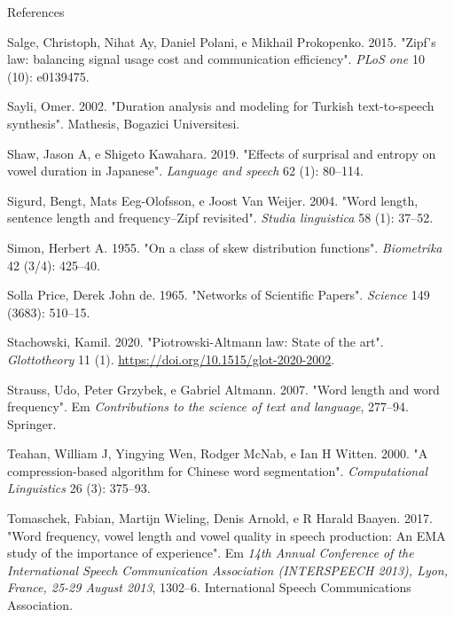 \documentclass[
  ignorenonframetext,
  aspectratio=169]{beamer}
\newlength{\cslhangindent}
\newlength{\cslentryspacingunit} %
\newenvironment{CSLReferences}[2] %
 {%
  \setlength{\parindent}{0pt}
  \ifodd #1
  \let\oldpar\par
  \def\par{\hangindent=\cslhangindent\oldpar}
  \fi
  \setlength{\parskip}{#2\cslentryspacingunit}
 }%
 {}
\begin{document}
\begin{frame}[allowframebreaks]{References}
\begin{CSLReferences}{1}{0}
\leavevmode{}%
Salge, Christoph, Nihat Ay, Daniel Polani, e Mikhail Prokopenko. 2015.
{"Zipf's law: balancing signal usage cost and communication
efficiency"}. \emph{PLoS one} 10 (10): e0139475.

\leavevmode{}%
Sayli, Omer. 2002. {"Duration analysis and modeling for Turkish
text-to-speech synthesis"}. Mathesis, Bogazici Universitesi.

\leavevmode{}%
Shaw, Jason A, e Shigeto Kawahara. 2019. {"Effects of surprisal and
entropy on vowel duration in Japanese"}. \emph{Language and speech} 62
(1): 80--114.

\leavevmode{}%
Sigurd, Bengt, Mats Eeg-Olofsson, e Joost Van Weijer. 2004. {"Word
length, sentence length and frequency--Zipf revisited"}. \emph{Studia
linguistica} 58 (1): 37--52.

\leavevmode{}%
Simon, Herbert A. 1955. {"On a class of skew distribution functions"}.
\emph{Biometrika} 42 (3/4): 425--40.

\leavevmode{}%
Solla Price, Derek John de. 1965. {"Networks of Scientific Papers"}.
\emph{Science} 149 (3683): 510--15.

\leavevmode{}%
Stachowski, Kamil. 2020. {"Piotrowski-Altmann law: State of the art"}.
\emph{Glottotheory} 11 (1).
\url{https://doi.org/10.1515/glot-2020-2002}.

\leavevmode{}%
Strauss, Udo, Peter Grzybek, e Gabriel Altmann. 2007. {"Word length and
word frequency"}. Em \emph{Contributions to the science of text and
language}, 277--94. Springer.

\leavevmode{}%
Teahan, William J, Yingying Wen, Rodger McNab, e Ian H Witten. 2000. {"A
compression-based algorithm for Chinese word segmentation"}.
\emph{Computational Linguistics} 26 (3): 375--93.

\leavevmode{}%
Tomaschek, Fabian, Martijn Wieling, Denis Arnold, e R Harald Baayen.
2017. {"Word frequency, vowel length and vowel quality in speech
production: An EMA study of the importance of experience"}. Em
\emph{14th Annual Conference of the International Speech Communication
Association (INTERSPEECH 2013), Lyon, France, 25-29 August 2013},
1302--6. International Speech Communications Association.


\end{CSLReferences}
\end{frame}
\end{document}

